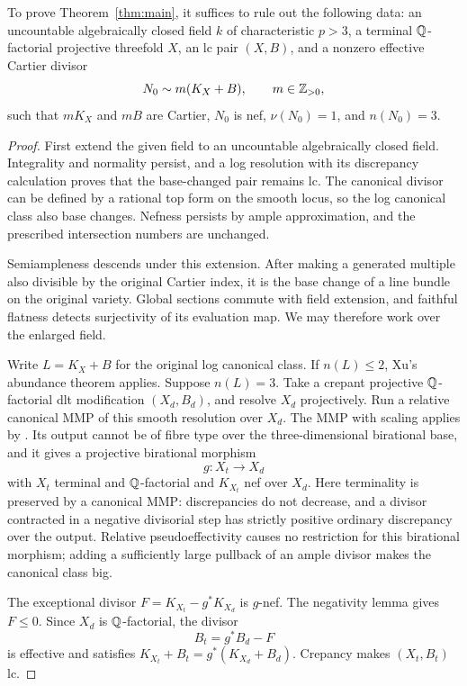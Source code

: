 \begin{proposition}\label{prop:reduction}
To prove Theorem~\ref{thm:main}, it suffices to rule out the following
data: an uncountable algebraically closed field $k$ of characteristic
$p>3$, a terminal $\mathbb Q$-factorial projective threefold $X$, an lc pair
$(X,B)$, and a nonzero effective Cartier divisor
\begin{equation}\label{eq:N0}
N_0\sim m(K_X+B),\qquad m\in\mathbb Z_{>0},
\end{equation}
such that $mK_X$ and $mB$ are Cartier, $N_0$ is nef,
$\nu(N_0)=1$, and $n(N_0)=3$.
\end{proposition}
\begin{proof}
First extend the given field to an uncountable algebraically closed
field. Integrality and normality persist, and a log resolution with its
discrepancy calculation proves that the base-changed pair remains lc.
The canonical divisor can be defined by a rational top form on the
smooth locus, so the log canonical class also base changes. Nefness
persists by ample approximation, and the prescribed intersection numbers
are unchanged.

Semiampleness descends under this extension. After making a generated
multiple also divisible by the original Cartier index, it is the base
change of a line bundle on the original variety. Global sections commute
with field extension, and faithful flatness detects surjectivity of its
evaluation map. We may therefore work over the enlarged field.

Write $L=K_X+B$ for the original log canonical class. If $n(L)\leq2$,
Xu's abundance theorem applies. Suppose $n(L)=3$. Take a crepant
projective $\mathbb Q$-factorial dlt modification $(X_d,B_d)$, and resolve $X_d$
projectively. Run a relative canonical MMP of this smooth resolution over
$X_d$. The MMP with scaling applies by \cite[Theorem~1.2]{HW}. Its output
cannot be of fibre type over the three-dimensional birational base, and
it gives a projective birational morphism
\[
g:X_t\longrightarrow X_d
\]
with $X_t$ terminal and $\mathbb Q$-factorial and $K_{X_t}$ nef over $X_d$.
Here terminality is preserved by a canonical MMP: discrepancies do not
decrease, and a divisor contracted in a negative divisorial step has
strictly positive ordinary discrepancy over the output. Relative pseudoeffectivity
causes no restriction for this birational morphism; adding a sufficiently
large pullback of an ample divisor makes the canonical class big.

The exceptional divisor $F=K_{X_t}-g^*K_{X_d}$ is $g$-nef. The negativity
lemma gives $F\leq0$. Since $X_d$ is $\mathbb Q$-factorial, the divisor
\[
B_t=g^*B_d-F
\]
is effective and satisfies
$K_{X_t}+B_t=g^*(K_{X_d}+B_d)$. Crepancy makes $(X_t,B_t)$ lc.


\end{proof}
